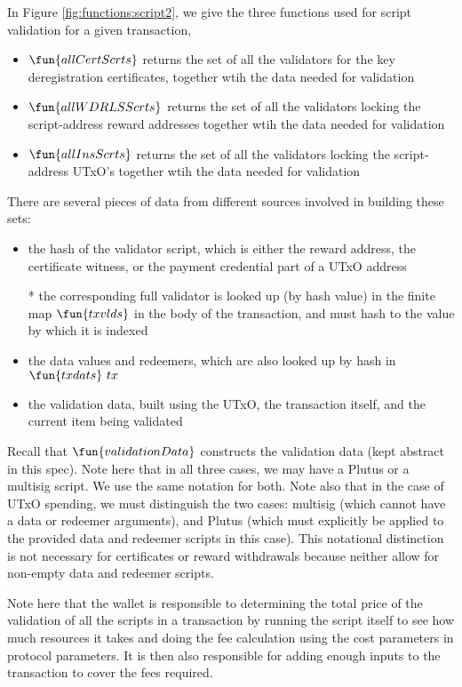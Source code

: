In Figure \ref{fig:functions:script2}, we give the three functions
used for script validation for a given transaction,

\begin{itemize}
\item $\fun{allCertScrts}$ returns the set of all the validators for the
key deregistration certificates, together
wtih the data needed for validation
\item $\fun{allWDRLSScrts}$ returns the set of all the validators locking
the script-address reward addresses together
wtih the data needed for validation
\item $\fun{allInsScrts}$ returns the set of all the validators locking
the script-address UTxO's together
wtih the data needed for validation
\end{itemize}

There are several pieces of data from different sources involved in building these
sets:

\begin{itemize}
\item the hash of the validator script, which is either the reward address,
the certificate witness, or the payment credential part of a UTxO address

* the corresponding
full validator is looked up (by hash value) in the finite map $\fun{txvlds}$ in the
body of the transaction, and must hash to the value by which it is indexed

\item the data values and redeemers, which are also looked up by hash in $\fun{txdats}~{tx}$

\item the validation data, built using the UTxO, the transaction itself,
and the current item being validated
\end{itemize}

Recall that $\fun{validationData}$ constructs the validation data (kept abstract
in this spec).
Note here that in all three cases, we may have a Plutus or a multisig script.
We use the same notation for both. Note also that in the case of UTxO
spending, we must distinguish the two cases: multisig (which cannot
have a data or redeemer arguments), and Plutus (which must explicitly be
applied to the provided data and redeemer scripts in this case).
This notational distinction is not necessary for certificates or reward withdrawals
because neither allow for non-empty data and redeemer scripts.

Note here that the wallet is responsible to determining the total price of the
validation of all the scripts in a transaction
by running the script itself to see how much resources it takes and doing the
fee calculation using the cost parameters in protocol parameters. It is then
also responsible for adding enough inputs to the transaction to cover the
fees required.

